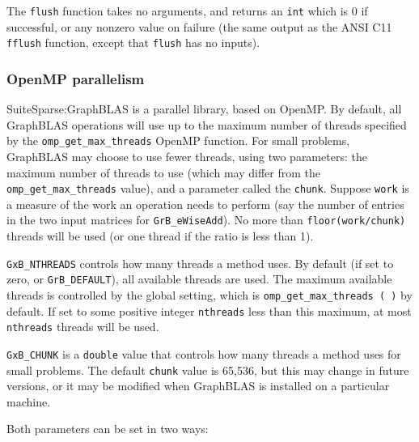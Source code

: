 The \verb'flush' function takes no
arguments, and returns an \verb'int' which is 0 if successful, or any nonzero
value on failure (the same output as the ANSI C11 \verb'fflush' function,
except that \verb'flush' has no inputs).

\subsubsection{OpenMP parallelism}
\label{omp_parallelism}

SuiteSparse:GraphBLAS is a parallel library, based on OpenMP.  By
default, all GraphBLAS operations will use up to the maximum number of threads
specified by the \verb'omp_get_max_threads' OpenMP function.  For small
problems, GraphBLAS may choose to use fewer threads, using two parameters: the
maximum number of threads to use (which may differ from the
\verb'omp_get_max_threads' value), and a parameter called the \verb'chunk'.
Suppose \verb'work' is a measure of the work an operation needs to perform (say
the number of entries in the two input matrices for \verb'GrB_eWiseAdd').  No
more than \verb'floor(work/chunk)' threads will be used (or one thread if the
ratio is less than 1).

\verb'GxB_NTHREADS' controls how many threads a method uses.
    By default (if set to zero, or \verb'GrB_DEFAULT'), all available threads
    are used.  The maximum available threads is controlled by the global
    setting, which is \verb'omp_get_max_threads ( )' by default.  If set to
    some positive integer \verb'nthreads' less than this maximum, at most
    \verb'nthreads' threads will be used.

\verb'GxB_CHUNK' is a \verb'double' value that controls how many threads
    a method uses for small problems.
The default \verb'chunk' value is 65,536, but this may change in future
versions, or it may be modified when GraphBLAS is installed on a particular
machine.

Both parameters can be set in two ways:

